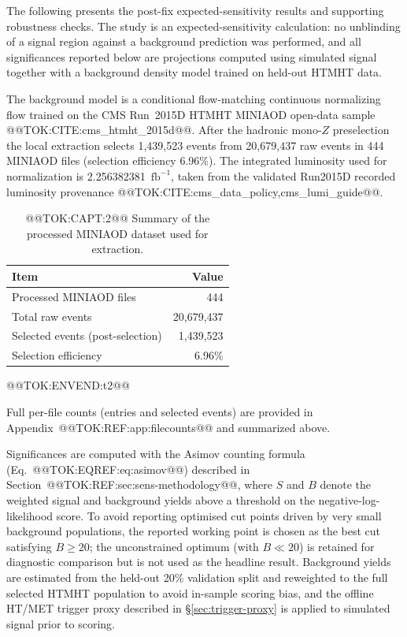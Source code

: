 \documentclass[11pt]{article}
\newcommand{\invfb}{\ensuremath{\mathrm{fb}^{-1}}}
\begin{document}
The following presents the post-fix expected-sensitivity results and
supporting robustness checks. The study is an expected-sensitivity
calculation: no unblinding of a signal region against a background
prediction was performed, and all significances reported below are projections
computed using simulated signal together with a background density model
trained on held-out HTMHT data.

The background model is a conditional flow-matching continuous normalizing
flow trained on the CMS Run~2015D HTMHT MINIAOD open-data sample
@@TOK:CITE:cms_htmht_2015d@@. After the hadronic mono-$Z$ preselection the local
extraction selects 1,439,523 events from 20,679,437 raw events in 444
MINIAOD files (selection efficiency 6.96\%). The integrated luminosity used
for normalization is 2.256382381~\invfb, taken from the validated Run2015D
recorded luminosity provenance @@TOK:CITE:cms_data_policy,cms_lumi_guide@@.

\begin{table}[H]
  \centering
  \caption{@@TOK:CAPT:2@@ Summary of the processed MINIAOD dataset used for extraction.}
  \begin{tabular}{@{}>{\raggedright\arraybackslash}p{}r@{}}
    \toprule
    Item & Value \\
    \midrule
    Processed MINIAOD files & 444 \\
    Total raw events & 20,679,437 \\
    Selected events (post-selection) & 1,439,523 \\
    Selection efficiency & 6.96\% \\
    \bottomrule
  \end{tabular}
  \label{tab:data-summary}
@@TOK:ENVEND:t2@@\end{table}

Full per-file counts (entries and selected events) are provided in
Appendix~@@TOK:REF:app:filecounts@@ and summarized above.

Significances are computed with the Asimov counting formula
(Eq.~@@TOK:EQREF:eq:asimov@@) described in Section~@@TOK:REF:sec:sens-methodology@@,
where $S$ and $B$ denote the weighted signal and background yields above a
threshold on the negative-log-likelihood score. To avoid reporting
optimised cut points driven by very small background populations, the
reported working point is chosen as the best cut satisfying $B\geq20$; the
unconstrained optimum (with $B\ll20$) is retained for diagnostic comparison
but is not used as the headline result. Background yields are estimated from
the held-out 20\% validation split and reweighted to the full selected HTMHT
population to avoid in-sample scoring bias, and the offline HT/MET trigger
proxy described in \S\ref{sec:trigger-proxy} is applied to simulated signal
prior to scoring.
\end{document}
